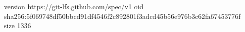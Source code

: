 version https://git-lfs.github.com/spec/v1
oid sha256:5f069748df50bbcd91df4546f2c892801f3adcd45b56e976b3c62fa67453776f
size 1336
